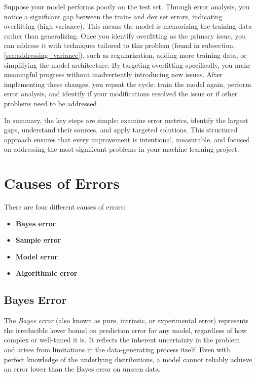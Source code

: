 \documentclass[12pt,openany, draft]{book}
\begin{document}
\begin{examplebox}
Suppose your model performs poorly on the test set. Through error analysis, you notice a significant gap between the train- and dev set errors, indicating overfitting (high variance). This means the model is memorizing the training data rather than generalizing. Once you identify overfitting as the primary issue, you can address it with techniques tailored to this problem (found in subsection: \ref{sec:addressing_variance}), such as regularization, adding more training data, or simplifying the model architecture. By targeting overfitting specifically, you make meaningful progress without inadvertently introducing new issues. After implementing these changes, you repeat the cycle: train the model again, perform error analysis, and identify if your modifications resolved the issue or if other problems need to be addressed.
\end{examplebox}

In summary, the key steps are simple: examine error metrics, identify the largest gaps, understand their sources, and apply targeted solutions. This structured approach ensures that every improvement is intentional, measurable, and focused on addressing the most significant problems in your machine learning project.



\section{Causes of Errors}

There are four different causes of errors:
\begin{itemize}
    \item \textbf{Bayes error}
    \item \textbf{Sample error}
    \item \textbf{Model error}
    \item \textbf{Algorithmic error}
\end{itemize}


\subsection{Bayes Error}  \label{subsec:Bayes_error}

The \textit{Bayes error} (also known as pure, intrinsic, or experimental error) represents the irreducible lower bound on prediction error for any model, regardless of how complex or well-tuned it is. It reflects the inherent uncertainty in the problem and arises from limitations in the data-generating process itself. Even with perfect knowledge of the underlying distributions, a model cannot reliably achieve an error lower than the Bayes error on unseen data. \newline
\end{document}
